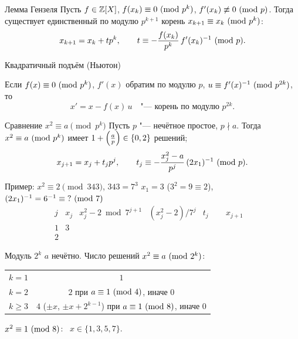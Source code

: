 \documentclass{ca-slides}
\begin{document}
\begin{theoremframe}{Лемма Гензеля}
  Пусть $f \in \mathbb{Z}[X]$, $f(x_k) \equiv 0 \ (\mathrm{mod}\ p^k)$, $f'(x_k) \not\equiv 0 \ (\mathrm{mod}\ p)$. Тогда
  существует единственный по модулю $p^{k+1}$ корень $x_{k+1} \equiv x_k \ (\mathrm{mod}\ p^k)$:
  \[
    x_{k+1} = x_k + t p^k, \qquad t \equiv -\frac{f(x_k)}{p^k}\, f'(x_k)^{-1} \ (\mathrm{mod}\ p) .
  \]
\end{theoremframe}

\begin{canvasframe}{Квадратичный подъём (Ньютон)}
  \begin{proposition}
    Если $f(x) \equiv 0 \ (\mathrm{mod}\ p^k)$, $f'(x)$ обратим по модулю $p$,
    $u \equiv f'(x)^{-1} \ (\mathrm{mod}\ p^{2k})$, то
    \[
      x' = x - f(x)\,u \quad\text{"--- корень по модулю } p^{2k}.
    \]
  \end{proposition}
  \proofarea[0.1\textheight]
\end{canvasframe}

\begin{theoremframe}{Сравнение $x^2 \equiv a \pmod{p^k}$}
  Пусть $p$ "--- нечётное простое, $p \nmid a$. Тогда $x^2 \equiv a \ (\mathrm{mod}\ p^k)$ имеет
  $1 + \left(\frac{a}{p}\right) \in \{0, 2\}$ решений;
  \[
    x_{j+1} = x_j + t_j p^j, \qquad t_j \equiv -\frac{x_j^2 - a}{p^j}\,(2x_1)^{-1} \ (\mathrm{mod}\ p).
  \]
\end{theoremframe}

\begin{canvasframe}{Пример: $x^2 \equiv 2 \pmod{343}$, $343 = 7^3$}
  $x_1 = 3$ ($3^2 = 9 \equiv 2$), \quad $(2x_1)^{-1} = 6^{-1} \equiv \;? \ (\mathrm{mod}\ 7)$
  \[
    \begin{array}{c|c|c|c|c|c}
      j & x_j & x_j^2 - 2 \bmod 7^{j+1} & (x_j^2 - 2)/7^j & t_j & x_{j+1} \\ \hline
      1 & 3 & \hspace{3em} & \hspace{3em} & \hspace{2em} & \hspace{3em} \\[1ex]
      2 & & & & &
    \end{array}
  \]
\end{canvasframe}

\begin{canvasframe}{Модуль $2^k$}
  $a$ нечётно. Число решений $x^2 \equiv a \ (\mathrm{mod}\ 2^k)$:
  \begin{center}
  \begin{tabular}{c|c}
    $k = 1$ & $1$ \\
    $k = 2$ & $2$ при $a \equiv 1 \ (\mathrm{mod}\ 4)$, иначе $0$ \\
    $k \ge 3$ & $4$ ($\pm x$, $\pm x + 2^{k-1}$) при $a \equiv 1 \ (\mathrm{mod}\ 8)$, иначе $0$
  \end{tabular}
  \end{center}
  $x^2 \equiv 1 \ (\mathrm{mod}\ 8)$: \ $x \in \{1, 3, 5, 7\}$.
  \penspace[0.18\textheight]
\end{canvasframe}
\end{document}
